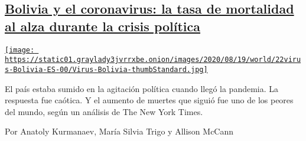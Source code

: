 \begin{enumerate}
\begin{enumerate}
    \hypertarget{bolivia-y-el-coronavirus-la-tasa-de-mortalidad-al-alza-durante-la-crisis-poluxedtica}{%
    \subsection{\texorpdfstring{\href{/es/2020/08/22/espanol/america-latina/bolivia-coronavirus.html}{Bolivia
    y el coronavirus: la tasa de mortalidad al alza durante la crisis
    política}}{Bolivia y el coronavirus: la tasa de mortalidad al alza durante la crisis política}}\label{bolivia-y-el-coronavirus-la-tasa-de-mortalidad-al-alza-durante-la-crisis-poluxedtica}}

    \href{/es/2020/08/22/espanol/america-latina/bolivia-coronavirus.html}{\texttt{[image: https://static01.graylady3jvrrxbe.onion/images/2020/08/19/world/22virus-Bolivia-ES-00/Virus-Bolivia-thumbStandard.jpg]}}

    El país estaba sumido en la agitación política cuando llegó la
    pandemia. La respuesta fue caótica. Y el aumento de muertes que
    siguió fue uno de los peores del mundo, según un análisis de The New
    York Times.

    Por Anatoly Kurmanaev, María Silvia Trigo y Allison McCann
  \end{enumerate}
\end{enumerate}

